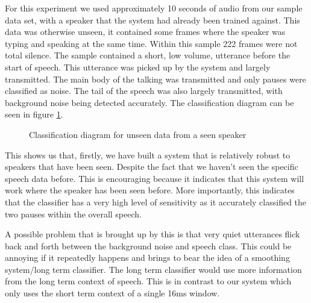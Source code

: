 \documentclass[ %
                    author={Sam Phippen},
                supervisor={Dr. Rafal Bogacz},
                     title={Real time voice activity detectors in noisy personal computing environments},
                  subtitle={},
                    degree={MEng},
                      year={2012} ]{thesis}
\begin{document}
For this experiment we used approximately 10 seconds of audio from our sample
data set, with a speaker that the system had already been trained against. This
data was otherwise unseen, it contained some frames where the speaker was
typing and speaking at the same time. Within this sample 222 frames were not
total silence. The sample contained a short, low volume, utterance before the
start of speech. This utterance was picked up by the system and largely
transmitted. The main body of the talking was transmitted and only pauses were
classified as noise. The tail of the speech was also largely transmitted, with
background noise being detected accurately. The classification diagram can be
seen in figure \ref{fig:ultimation}.

\begin{figure}
    \caption{Classification diagram for unseen data from a seen speaker}
    \label{fig:ultimation}
\end{figure}

This shows us that, firstly, we have built a system that is relatively robust
to speakers that have been seen. Despite the fact that we haven't seen the
specific speech data before. This is encouraging because it indicates that this
system will work where the speaker has been seen before. More importantly, this
indicates that the classifier has a very high level of sensitivity as it
accurately classified the two pauses within the overall speech.

A possible problem that is brought up by this is that very quiet utterances
flick back and forth between the background noise and speech class. This could
be annoying if it repeatedly happens and brings to bear the idea of a smoothing
system/long term classifier. The long term classifier would use more
information from the long term context of speech. This is in contrast to our
system which only uses the short term context of a single 16ms window.
\end{document}
